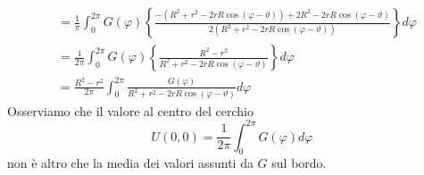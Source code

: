 \documentclass[10pt,a4paper,twoside,openright]{book}
\begin{document}
\begin{dimostrazione}
\begin{align*}
                       & =\frac{1}{\pi }\int ^{2\pi }_{0} G(\varphi)\left\{\frac{-\left(R^{2} +r^{2} -2rR\cos(\varphi -\vartheta)\right) +2R^{2} -2rR\cos(\varphi -\vartheta)}{2\left(R^{2} +r^{2} -2rR\cos(\varphi -\vartheta)\right)}\right\} d\varphi \\
                       & =\frac{1}{2\pi }\int ^{2\pi }_{0} G(\varphi)\left\{\frac{R^{2} -r^{2}}{R^{2} +r^{2} -2rR\cos(\varphi -\vartheta)}\right\} d\varphi                                                                                              \\
                       & =\frac{R^{2} -r^{2}}{2\pi }\int ^{2\pi }_{0}\frac{G(\varphi)}{R^{2} +r^{2} -2rR\cos(\varphi -\vartheta)} d\varphi
    \end{align*}
    Osserviamo che il valore al centro del cerchio
    \begin{equation*}
        U(0,0) =\frac{1}{2\pi }\int ^{2\pi }_{0} G(\varphi) d\varphi
    \end{equation*}
    non è altro che la media dei valori assunti da $G$ sul bordo.


\end{dimostrazione}
\end{document}
